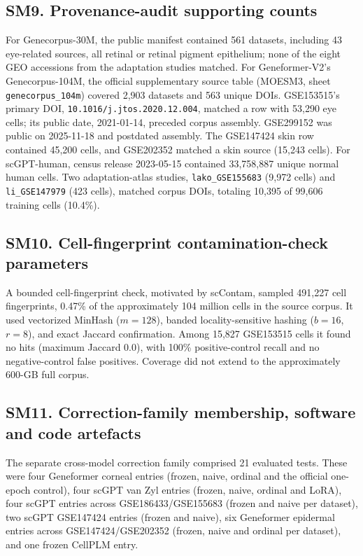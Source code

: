 \documentclass[12pt,a4paper]{article}
\begin{document}
\subsection*{SM9. Provenance-audit supporting counts}
For Genecorpus-30M, the public manifest contained 561 datasets, including 43 eye-related sources, all retinal or retinal pigment epithelium; none of the eight GEO accessions from the adaptation studies matched. For Geneformer-V2's Genecorpus-104M, the official supplementary source table (MOESM3, sheet \texttt{genecorpus\_104m}) covered 2,903 datasets and 563 unique DOIs. GSE153515's primary DOI, \texttt{10.1016/j.jtos.2020.12.004}, matched a row with 53,290 eye cells; its public date, 2021-01-14, preceded corpus assembly. GSE299152 was public on 2025-11-18 and postdated assembly. The GSE147424 skin row contained 45,200 cells, and GSE202352 matched a skin source (15,243 cells). For scGPT-human, census release 2023-05-15 contained 33,758,887 unique normal human cells. Two adaptation-atlas studies, \texttt{lako\_GSE155683} (9,972 cells) and \texttt{li\_GSE147979} (423 cells), matched corpus DOIs, totaling 10,395 of 99,606 training cells (10.4\%).

\subsection*{SM10. Cell-fingerprint contamination-check parameters}
A bounded cell-fingerprint check, motivated by scContam, sampled 491,227 cell fingerprints, 0.47\% of the approximately 104 million cells in the source corpus. It used vectorized MinHash ($m=128$), banded locality-sensitive hashing ($b=16$, $r=8$), and exact Jaccard confirmation. Among 15,827 GSE153515 cells it found no hits (maximum Jaccard 0.0), with 100\% positive-control recall and no negative-control false positives. Coverage did not extend to the approximately 600-GB full corpus.

\subsection*{SM11. Correction-family membership, software and code artefacts}
The separate cross-model correction family comprised 21 evaluated tests. These were four Geneformer corneal entries (frozen, naive, ordinal and the official one-epoch control), four scGPT van Zyl entries (frozen, naive, ordinal and LoRA), four scGPT entries across GSE186433/GSE155683 (frozen and naive per dataset), two scGPT GSE147424 entries (frozen and naive), six Geneformer epidermal entries across GSE147424/GSE202352 (frozen, naive and ordinal per dataset), and one frozen CellPLM entry.
\end{document}
